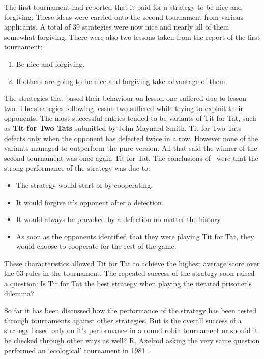 \documentclass{article}
\theoremstyle{definition}
\begin{document}
The first tournament had reported that it paid for a strategy to be nice and forgiving.
These ideas were carried onto the second tournament from various applicants.
A total of 39 strategies were now nice and nearly all of them somewhat forgiving.
There were also two lessons taken from the report of the first tournament:

\begin{enumerate}
    \item Be nice and forgiving.
    \item If others are going to be nice and forgiving take advantage of them.
\end{enumerate}

The strategies that based their behaviour on lesson one suffered due to lesson
two. The strategies following lesson two suffered while trying to exploit their
opponents. The most successful entries tended to be variants of Tit for Tat,
such as \textbf{Tit for Two Tats} submitted by John Maynard Smith. Tit for Two
Tats defects only when the opponent has defected twice in a row. However
none of the variants managed to outperform the pure version. All that said
the winner of the second tournament was once again Tit for Tat. The conclusions
of~\cite{Axelrod1980a} were that the strong performance of the strategy was due to:

\begin{itemize}
    \item The strategy would start of by cooperating.
    \item It would forgive it's opponent after a defection.
    \item It would always be provoked by a defection no matter the history.
    \item As soon as the opponents identified that they were playing Tit for Tat,
    they would choose to cooperate for the rest of the game.
\end{itemize}
These characteristics allowed Tit for Tat to achieve the highest average score
over the 63 rules in the tournament. The repeated success of the strategy soon raised
a question: Is Tit for Tat the best strategy when playing the iterated prisoner's dilemma? 

So far it has been discussed how the performance of the strategy has been tested
through tournaments against other strategies. But is the overall success of a
strategy based only on it's performance in a round robin tournament or should
it be checked through other ways as well? R. Axelrod asking the very same question
performed an `ecological' tournament in 1981~\cite{Axelrod1984}.
\end{document}
